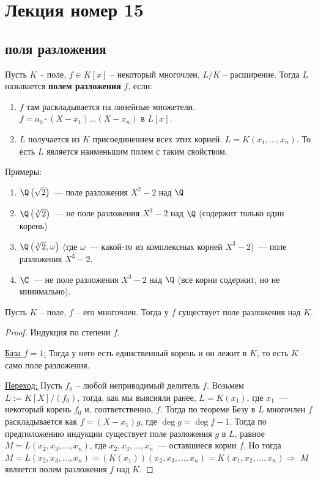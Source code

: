 \section{Лекция номер 15}
\subsection{поля разложения}

\begin{conj}
    Пусть $K$ -- поле, $f \in K[x]$ -- некоторый многочлен, $L/K$ -- расширение. Тогда $L$ называется \textbf{полем разложения} $f$, если:
    \begin{enumerate}
        \item $f$ там раскладывается на линейные множетели. $f = a_0 \cdot (X - x_1) \dots (X - x_n)$ в $L[x]$. 
        \item $L$ получается из $K$ присоединением всех этих корней. $L = K(x_1, \dots, x_n)$. То есть $L$ является наименьшим полем с таким свойством. 
    \end{enumerate}
\end{conj}
Примеры:
\begin{enumerate}
    \item $\Q\left(\sqrt 2\right)$~--- поле разложения $X^2-2$ над $\Q$
    \item $\Q\left(\sqrt[3]{2}\right)$~--- не поле разложения $X^3-2$ над $\Q$ (содержит только один корень)
    \item $\Q\left(\sqrt[3]{2}, \omega\right)$ (где $\omega$~--- какой-то из комплексных корней $X^3-2$)~--- поле разложения $X^3-2$.
    \item $\C$~--- не поле разложения $X^3-2$ над $\Q$ (все корни содержит, но не минимально).
\end{enumerate}

\begin{theorem}
    Пусть $K$ -- поле, $f$ -- его многочлен. Тогда у $f$ существует поле разложения над $K$. 
\end{theorem}
\begin{proof}
    Индукция по степени $f$. 

    \quad \underline{База $f = 1$:} Тогда у него есть единственный корень и он лежит в $K$, то есть $K$ -- само поле разложения. 

    \quad \underline{Переход:} Пусть $f_0$ -- любой неприводимый делитель $f$.
    Возьмем $L := K[X] / (f_0)$, тогда, как мы выясняли ранее, $L=K(x_1)$, где $x_1$~--- некоторый корень $f_0$ и, соответственно, $f$.
    Тогда по теореме Безу в $L$ многочлен $f$ раскладывается как $f=(X-x_1)g$, где $\deg g = \deg f - 1$.
    Тогда по предположению индукции существует поле разложения $g$ в $L$, равное $M=L(x_2, x_3, \ldots, x_n)$, где $x_2,x_3,\ldots, x_n$~--- оставшиеся корни $f$.
    Но тогда $M=L(x_2, x_3, \ldots, x_n) = (K(x_1))(x_2, x_3, \ldots, x_n) = K(x_1, x_2, \ldots, x_n) \Rightarrow$ $M$ является полем разложения $f$ над $K$.
\end{proof}


